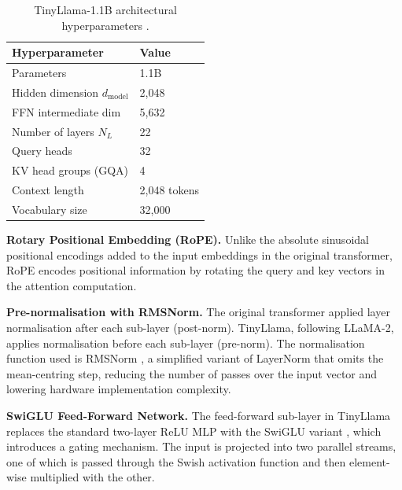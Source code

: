 \begin{table}[H]
  \centering
  \begin{tabular}{ll}
    \toprule
    Hyperparameter          & Value  \\
    \midrule
    Parameters              & 1.1B   \\
    Hidden dimension $d_{\text{model}}$ & 2{,}048 \\
    FFN intermediate dim    & 5{,}632 \\
    Number of layers $N_L$  & 22     \\
    Query heads             & 32     \\
    KV head groups (GQA)    & 4      \\
    Context length          & 2{,}048 tokens \\
    Vocabulary size         & 32{,}000 \\
    \bottomrule
  \end{tabular}
  \caption{TinyLlama-1.1B architectural hyperparameters
           \cite{zhang2024tinyllama}.}
  \label{tab:tinyllama_arch}

\end{table}

\noindent\textbf{Rotary Positional Embedding (RoPE).} Unlike the absolute
sinusoidal positional encodings added to the input embeddings in the
original transformer, RoPE \cite{su2024roformer} encodes positional information
by rotating the query and key vectors in the attention computation. 

\noindent\textbf{Pre-normalisation with RMSNorm.} The original transformer
applied layer normalisation after each sub-layer (post-norm). TinyLlama,
following LLaMA-2, applies normalisation before each sub-layer (pre-norm).
The normalisation function used is RMSNorm \cite{zhang2019rmsnorm}, 
a simplified variant of
LayerNorm that omits the mean-centring step, reducing the number of passes
over the input vector and lowering hardware implementation complexity.

\noindent\textbf{SwiGLU Feed-Forward Network.} The feed-forward sub-layer
in TinyLlama replaces the standard two-layer ReLU MLP with the SwiGLU
variant \cite{shazeer2020glu}, which introduces a gating mechanism. The input
is projected into two parallel streams, one of which is passed through the
Swish activation function and then element-wise multiplied with the other.

